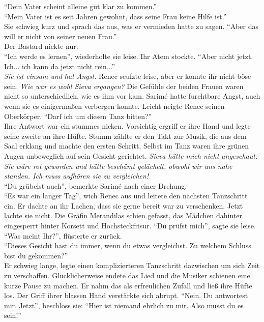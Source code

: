 ``Dein Vater scheint alleine gut klar zu kommen.''\\
``Mein Vater ist es seit Jahren gewohnt, dass seine Frau keine Hilfe ist.''\\
Sie schwieg kurz und sprach das aus, was er vermieden hatte zu sagen. ``Aber das will er nicht von 
seiner neuen Frau.''\\
Der Bastard nickte nur.\\
``Ich werde es lernen'', wiederholte sie leise. Ihr Atem stockte. ``Aber nicht jetzt. Ich... ich 
kann da jetzt nicht rein...''\\
\textit{Sie ist einsam und hat Angst.} Renec seufzte leise, aber er konnte ihr nicht böse sein. 
\textit{Wie war es wohl Sieva ergangen?} Die Gefühle der beiden Frauen waren nicht so 
unterschiedlich, wie es ihm vor kam. Sarimé hatte furchtbare Angst, auch wenn sie es einigermaßen 
verbergen konnte. Leicht neigte Renec seinen Oberkörper. ``Darf ich um diesen Tanz bitten?''\\
Ihre Antwort war ein stummes nicken. Vorsichtig ergriff er ihre Hand und legte seine zweite an ihre 
Hüfte. Stumm zählte er den Takt zur Musik, die aus dem Saal erklang und machte den ersten Schritt. 
Selbst im Tanz waren ihre grünen Augen unbeweglich auf sein Gesicht gerichtet. \textit{Sieva 
hätte mich nicht angeschaut. Sie wäre rot geworden und hätte beschämt gelächelt, obwohl wir uns 
nahe standen. Ich muss aufhören sie zu vergleichen!}\\
``Du grübelst auch'', bemerkte Sarimé nach einer Drehung.\\
``Es war ein langer Tag'', wich Renec aus und leitete den nächsten Tanzschritt ein. Er dachte an 
ihr Lachen, dass sie gerne bereit war zu verschenken. Jetzt lachte sie nicht. Die Gräfin Merandilas 
schien gefasst, das Mädchen dahinter eingesperrt hinter Korsett und Hochsteckfrisur. 
``Du prüfst mich'', sagte sie leise.\\
``Was meint Ihr?'', flüsterte er zurück.\\
``Dieses Gesicht hast du immer, wenn du etwas vergleichst. Zu welchem Schluss bist du gekommen?''\\
Er schwieg lange, legte einen komplizierteren Tanzschritt dazwischen um sich Zeit zu verschaffen. 
Glücklicherweise endete das Lied und die Musiker schienen eine kurze Pause zu machen. Er nahm das 
als erfreulichen Zufall und ließ ihre Hüfte los. Der Griff ihrer blassen Hand verstärkte sich 
abrupt. ``Nein. Du antwortest mir. Jetzt'', beschloss sie: ``Hier ist niemand ehrlich zu mir. Also 
musst du es sein!''\\
